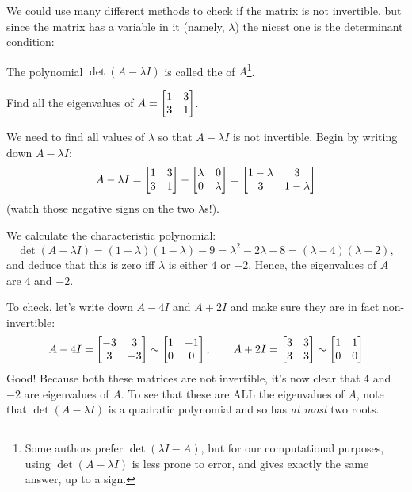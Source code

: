 
We could use many different methods to check if the matrix is not
invertible, but since the matrix has a variable in it (namely,
$\lambda$) the nicest one is the determinant condition:


\begin{definition}\label{charpoly}
The polynomial $\det( A- \lambda I)$ is called the  of $A$\footnote{Some authors prefer $\det( \lambda I -A)$, but for our computational purposes, using $\det( A- \lambda I)$ is less prone to error, and gives exactly the same answer, up to a sign.}.
\end{definition}

\begin{myprob}
Find all the eigenvalues of $A = \left[ \begin{matrix} 1 & 3 \\ 3 & 1 \end{matrix} \right]$.

\begin{mysol}
We need to find all values of $\lambda$ so that $A-\lambda I $ is
not invertible.  Begin by writing down $A-\lambda I $:
$$
A-\lambda I = \left[ \begin{matrix} 1 & 3 \\ 3 & 1 \end{matrix} \right] -\left[ \begin{matrix} \lambda & 0 \\ 0 & \lambda \end{matrix} \right]
= \left[ \begin{matrix}   1-\lambda & 3\\ 3 &   1-\lambda \end{matrix} \right]
$$
(watch those negative signs on the two $\lambda$s!).

We calculate the characteristic polynomial:
$$
\det(A-\lambda I) = (1-\lambda)(1-\lambda) - 9  = \lambda^2 -2\lambda -8
 = (\lambda - 4)(\lambda + 2),
$$
and deduce that this is zero iff $\lambda$ is either $4$ or $-2$.
Hence, the eigenvalues of $A$ are $4$ and $-2$.  

To check, let's write down $ A-4I$ and $A+2I$ and make sure they are
in fact non-invertible:
$$
A-4I = \left[ \begin{matrix} -3&3\\3&-3 \end{matrix} \right]\sim \left[ \begin{matrix} 1&-1\\0&0 \end{matrix} \right], \qquad A+2I = \left[ \begin{matrix} 3&3\\3&3 \end{matrix} \right]\sim \left[ \begin{matrix} 1&1\\0&0 \end{matrix} \right]
$$
Good! Because both these matrices are not invertible, it's now clear that $4$ and $-2$ are eigenvalues of $A$. To
see that these are ALL the eigenvalues of $A$, note that $\det(A-\lambda I)$
is a quadratic polynomial and so has {\it at most} two roots.

 
\end{mysol}\end{myprob}
 

